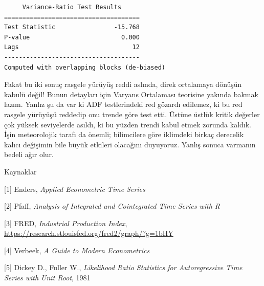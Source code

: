\documentclass[12pt,fleqn]{article}\usepackage{../../common}
\begin{document}
\begin{verbatim}
     Variance-Ratio Test Results     
=====================================
Test Statistic                -15.768
P-value                         0.000
Lags                               12
-------------------------------------
Computed with overlapping blocks (de-biased)
\end{verbatim}

Fakat bu iki sonuç rasgele yürüyüş reddi aslında, direk ortalamaya dönüşün
kabulü değil! Bunun detayları için Varyans Ortalaması teorisine yakında
bakmak lazım. Yanlız şu da var ki ADF testlerindeki red gözardı edilemez,
ki bu red rasgele yürüyüşü reddedip onu trende göre test etti. Üstüne
üstlük kritik değerler çok yüksek seviyelerde asıldı, ki bu yüzden trendi
kabul etmek zorunda kaldık. İşin meteorolojik tarafı da önemli; bilimcilere
göre iklimdeki birkaç derecelik kalıcı değişimin bile büyük etkileri
olacağını duyuyoruz. Yanlış sonuca varmanın bedeli ağır olur.

Kaynaklar 

[1] Enders, {\em Applied Econometric Time Series}

[2] Pfaff, {\em Analysis of Integrated and Cointegrated Time Series with R}

[3] FRED, {\em Industrial Production Index}, \url{https://research.stlouisfed.org/fred2/graph/?g=1bHY}

[4] Verbeek, {\em A Guide to Modern Econometrics}

[5] Dickey D., Fuller W., {\em Likelihood Ratio Statistics for Autoregressive
Time Series with Unit Root}, 1981
\end{document}
